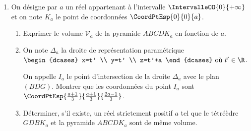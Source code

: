 \begin{enumerate}[resume]
	\item On désigne par $a$ un réel appartenant à l'intervalle $\IntervalleOO{0}{+\infty}$ et on note $K_a$ le point de coordonnées $\CoordPtEsp{0}{0}{a}$.
	\begin{enumerate}
		\item Exprimer le volume $\mathcal{V}_a$ de la pyramide $ABCDK_a$ en fonction de $a$.
		\item On note $\Delta_a$ la droite de représentation paramétrique $\begin{dcases} x=t' \\ y=t' \\ z=t'+a \end{dcases} \text{ où } t' \in \R$.
		
		On appelle $I_a$ le point d'intersection de la droite $\Delta_a$ avec le plan $(BDG)$. Montrer que les coordonnées du point $I_a$ sont $\CoordPtEsp{\frac{a+1}{3}}{\frac{a+1}{3}}{\frac{2a-1}{3}}$.
		\item Déterminer, s'il existe, un réel strictement positif $a$ tel que le tétréèdre $GDBK_a$ et la pyramide $ABCDK_a$ sont de même volume.
	\end{enumerate}
\end{enumerate}